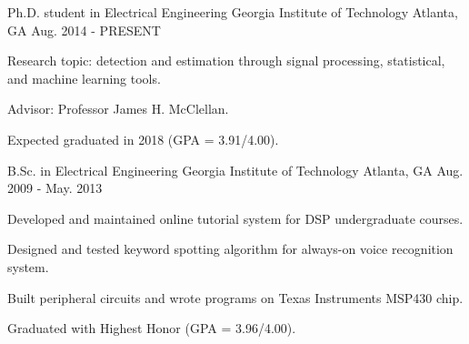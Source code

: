 

\begin{cventries}

  \cventry
    {Ph.D. student in Electrical Engineering} %
    {Georgia Institute of Technology} %
    {Atlanta, GA} %
    {Aug. 2014 - PRESENT} %
    {
      \begin{cvitems} %
        \item {Research topic: detection and estimation through signal processing, statistical, and machine learning tools.}
        \item {Advisor: Professor James H. McClellan.}
        \item {Expected graduated in 2018 (GPA = 3.91/4.00).}
      \end{cvitems}
    }
    
  \cventry
    {B.Sc. in Electrical Engineering} %
    {Georgia Institute of Technology} %
    {Atlanta, GA} %
    {Aug. 2009 - May. 2013} %
    {
      \begin{cvitems} %
        \item {Developed and maintained online tutorial system for DSP undergraduate courses.}
        \item {Designed and tested keyword spotting algorithm for always-on voice recognition system.}
        \item {Built peripheral circuits and wrote programs on Texas Instruments MSP430 chip.}
        \item {Graduated with Highest Honor (GPA = 3.96/4.00).}
      \end{cvitems}
    }

\end{cventries}
